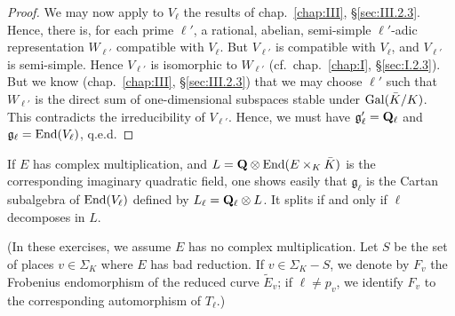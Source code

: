 \begin{proof}
We may now apply to $V_\ell$ the results of chap.~\ref{chap:III},
\S\ref{sec:III.2.3}.  Hence, there is, for each prime $\ell'$, a
rational, abelian, semi-simple $\ell'$-adic representation $W_{\ell'}$
compatible with $V_\ell$.  But $V_{\ell'}$ is compatible with $V_\ell$,
and $V_{\ell'}$ is semi-simple.  Hence $V_{\ell'}$ is isomorphic to
$W_{\ell'}$ (cf.~chap.~\ref{chap:I}, \S\ref{sec:I.2.3}).  But we know
(chap.~\ref{chap:III}, \S\ref{sec:III.2.3}) that we may choose $\ell'$
such that $W_{\ell'}$ is the direct sum of one-dimensional subspaces
stable under $\mathrm{Gal}(\bar{K}/K)$.  This contradicts the irreducibility of
$V_{\ell'}$.  Hence, we must have $\mathfrak{g}'_\ell = \mathbf{Q}_\ell$ and
$\mathfrak{g}_\ell = \mathrm{End}(V_\ell)$, q.e.d.
\end{proof}


If $E$ has complex multiplication, and
$L = \mathbf{Q} \mathbin{\otimes} \mathrm{End}(E \times_K \bar{K})$ is the corresponding imaginary
quadratic field, one shows easily that $\mathfrak{g}_\ell$ is the Cartan
subalgebra of $\mathrm{End}(V_\ell)$ defined by $L_\ell = \mathbf{Q}_\ell \mathbin{\otimes} L$.  It
splits if and only if $\ell$ decomposes in $L$.


(In these exercises, we assume $E$ has no complex multiplication.  Let
$S$ be the set of places $v \in \Sigma_K$ where $E$ has bad reduction.
If $v \in \Sigma_K - S$, we denote by $F_v$ the Frobenius endomorphism of
the reduced curve $\tilde{E}_v$; if $\ell \neq p_v$, we identify $F_v$ to
the corresponding automorphism of $T_\ell$.)

